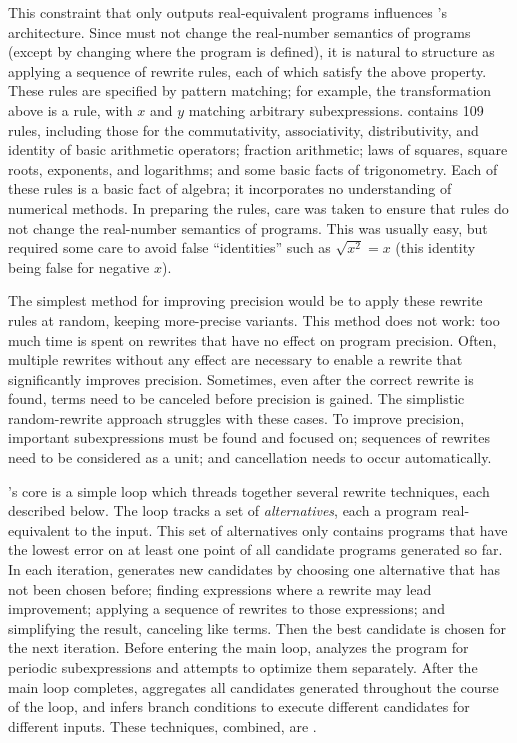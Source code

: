 \documentclass[paper.tex]{subfiles}
\begin{document}
This constraint that \casio only outputs real-equivalent programs
  influences \casio's architecture.
Since \casio must not change the real-number semantics of programs
  (except by changing where the program is defined),
  it is natural to structure \casio
  as applying a sequence of rewrite rules,
  each of which satisfy the above property.
These rules are specified by pattern matching;
  for example, the transformation above is a rule,
  with $x$ and $y$ matching arbitrary subexpressions.
\casio contains 109 rules,
  including those for
  the commutativity, associativity, distributivity, and identity
  of basic arithmetic operators;
  fraction arithmetic;
  laws of squares, square roots, exponents, and logarithms;
  and some basic facts of trigonometry.
Each of these rules is a basic fact of algebra;
  it incorporates no understanding of numerical methods.
In preparing the rules,
  care was taken to ensure that rules
  do not change the real-number semantics of programs.
This was usually easy, but required some care
  to avoid false ``identities'' such as $\sqrt{x^2} = x$
  (this identity being false for negative $x$).

The simplest method for improving precision
  would be to apply these rewrite rules at random,
  keeping more-precise variants.
This method does not work:
  too much time is spent on rewrites
  that have no effect on program precision.
Often, multiple rewrites without any effect
  are necessary to enable a rewrite that significantly improves precision.
Sometimes, even after the correct rewrite is found,
  terms need to be canceled before precision is gained.
The simplistic random-rewrite approach struggles with these cases.
To improve precision, important subexpressions
  must be found and focused on;
  sequences of rewrites need to be considered as a unit;
  and cancellation needs to occur automatically.

\casio's core is a simple loop
  which threads together several rewrite techniques,
  each described below.
The loop tracks a set of \emph{alternatives},
  each a program real-equivalent to the input.
This set of alternatives only contains
  programs that have the lowest error on at least one point
  of all candidate programs generated so far.
In each iteration, \casio generates new candidates
  by choosing one alternative that has not been chosen before;
  finding expressions where a rewrite may lead improvement;
  applying a sequence of rewrites to those expressions;
  and simplifying the result, canceling like terms.
Then the best candidate is chosen for the next iteration.
Before entering the main loop,
  \casio analyzes the program for periodic subexpressions
  and attempts to optimize them separately.
After the main loop completes,
  \casio aggregates all candidates generated
  throughout the course of the loop,
  and infers branch conditions
  to execute different candidates for different inputs.
These techniques, combined, are \casio.
\end{document}
